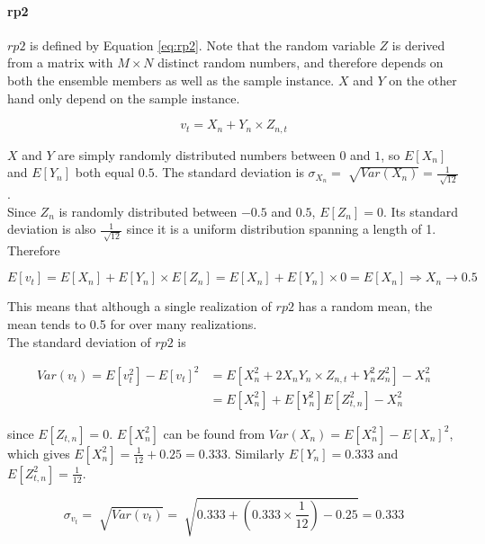 \documentclass{article}
\begin{document}
\paragraph{rp2}

$rp2$ is defined by Equation \ref{eq:rp2}. Note that the random variable $Z$ is derived from a matrix with $M \times N$ distinct random numbers, and therefore depends on both the ensemble members as well as the sample instance. $X$ and $Y$ on the other hand only depend on the sample instance.

\begin{equation} %
\label{eq:rp2}
v_t = X_n + Y_n \times Z_{n,t}
\end{equation}

$X$ and $Y$ are simply randomly distributed numbers between $0$ and $1$, so $E[X_n]$ and $E[Y_n]$ both equal $0.5$. The standard deviation is $\sigma_{X_n}=\sqrt[]{Var(X_n)}=\frac{1}{\sqrt[]{12}}$.\\

Since $Z_n$ is randomly distributed between $-0.5$ and $0.5$, $E[Z_n]=0$. Its standard deviation is also $\frac{1}{\sqrt[]{12}}$ since it is a uniform distribution spanning a length of 1. Therefore

\begin{equation}
E[v_t]=E[X_n]+E[Y_n] \times E[Z_n] =E[X_n]+E[Y_n] \times 0=E[X_n] \Rightarrow X_n \rightarrow 0.5
\end{equation}

This means that although a single realization of $rp2$ has a random mean, the mean tends to 0.5 for over many realizations.\\

The standard deviation of $rp2$ is

\begin{align}
Var(v_t) = E[v_t^2]-E[v_t]^2 &=E[X_n^2 + 2X_n Y_n \times Z_{n,t} + Y_n^2Z_n^2]-X_n^2\\
&= E[X_n^2]+E[Y_n^2]E[Z_{t,n}^2]-X_n^2
\end{align}

since $E[Z_{t,n}]=0$. $E[X_n^2]$ can be found from $Var(X_n)=E[X_n^2]-E[X_n]^2$, which gives $E[X_n^2]=\frac{1}{12} + 0.25 = 0.333$. Similarly $E[Y_n]=0.333$ and $E[Z_{t,n}^2]=\frac{1}{12}$.

\begin{equation}
\sigma_{v_t}=\sqrt[]{Var(v_t)}=\sqrt[]{0.333 + (0.333 \times \frac{1}{12}) - 0.25}=0.333
\end{equation}
\end{document}
